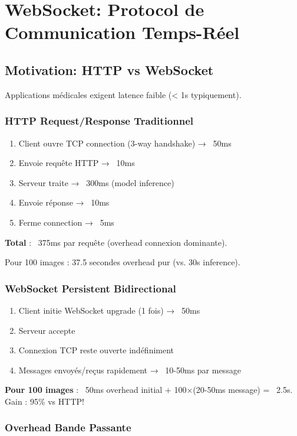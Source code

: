 \documentclass[12pt,a4paper,oneside]{report}
\begin{document}
\chapter{WebSocket: Protocol de Communication Temps-Réel}

\section{Motivation: HTTP vs WebSocket}

Applications médicales exigent latence faible (< 1s typiquement).

\subsection{HTTP Request/Response Traditionnel}

\begin{enumerate}
    \item Client ouvre TCP connection (3-way handshake) → ~50ms
    \item Envoie requête HTTP → ~10ms
    \item Serveur traite → ~300ms (model inference)
    \item Envoie réponse → ~10ms
    \item Ferme connection → ~5ms
\end{enumerate}

\textbf{Total} : ~375ms par requête (overhead connexion dominante).

Pour 100 images : 37.5 secondes overhead pur (vs. 30s inference).

\subsection{WebSocket Persistent Bidirectional}

\begin{enumerate}
    \item Client initie WebSocket upgrade (1 fois) → ~50ms
    \item Serveur accepte
    \item Connexion TCP reste ouverte indéfiniment
    \item Messages envoyés/reçus rapidement → ~10-50ms par message
\end{enumerate}

\textbf{Pour 100 images} : ~50ms overhead initial + 100×(20-50ms message) 
= ~2.5s. Gain : 95\% vs HTTP!

\subsection{Overhead Bande Passante}
\end{document}
